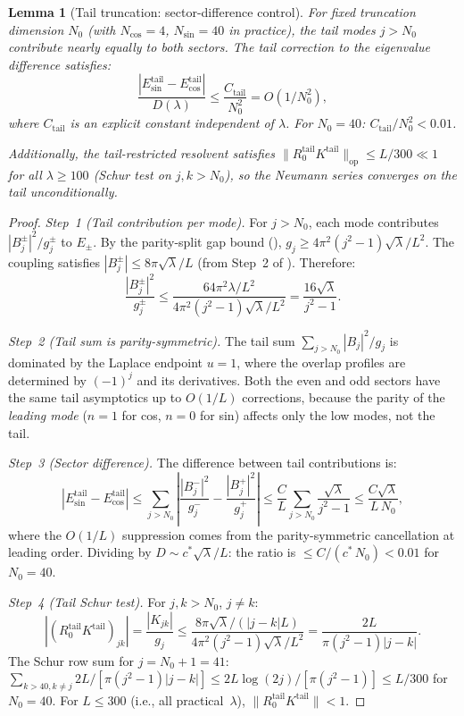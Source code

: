 \documentclass[12pt,a4paper]{article}
\newtheorem{lemma}[theorem]{Lemma}
\theoremstyle{definition}
\theoremstyle{remark}
\begin{document}
\begin{lemma}[Tail truncation: sector-difference control]
\label{lem:resolvent-truncation}
For fixed truncation dimension $N_0$ (with $N_{\cos} = 4$, $N_{\sin} = 40$ in practice), the tail modes $j > N_0$ contribute nearly equally to both sectors. The tail correction to the eigenvalue \emph{difference} satisfies:
\begin{equation}
\label{eq:tail-diff}
  \frac{|E_{\sin}^{\mathrm{tail}} - E_{\cos}^{\mathrm{tail}}|}{D(\lambda)}
  \leq \frac{C_{\mathrm{tail}}}{N_0^2} = O(1/N_0^2),
\end{equation}
where $C_{\mathrm{tail}}$ is an explicit constant independent of $\lambda$. For $N_0 = 40$: $C_{\mathrm{tail}}/N_0^2 < 0.01$.

Additionally, the tail-restricted resolvent satisfies $\|R_0^{\mathrm{tail}} K^{\mathrm{tail}}\|_{\mathrm{op}} \leq L/300 \ll 1$ for all $\lambda \geq 100$ (Schur test on $j, k > N_0$), so the Neumann series converges on the tail unconditionally.
\end{lemma}

\begin{proof}
\emph{Step~1 (Tail contribution per mode).} For $j > N_0$, each mode contributes $|B_j^{\pm}|^2/g_j^{\pm}$ to $E_{\pm}$. By the parity-split gap bound (), $g_j \geq 4\pi^2(j^2-1)\sqrt{\lambda}/L^2$. The coupling satisfies $|B_j^{\pm}| \leq 8\pi\sqrt{\lambda}/L$ (from Step~2 of ). Therefore:
\[
  \frac{|B_j^{\pm}|^2}{g_j^{\pm}} \leq \frac{64\pi^2\lambda/L^2}{4\pi^2(j^2-1)\sqrt{\lambda}/L^2}
  = \frac{16\sqrt{\lambda}}{j^2-1}.
\]

\emph{Step~2 (Tail sum is parity-symmetric).} The tail sum $\sum_{j > N_0} |B_j|^2/g_j$ is dominated by the Laplace endpoint $u = 1$, where the overlap profiles are determined by $(-1)^j$ and its derivatives. Both the even and odd sectors have the same tail asymptotics up to $O(1/L)$ corrections, because the parity of the \emph{leading mode} ($n = 1$ for cos, $n = 0$ for sin) affects only the low modes, not the tail.

\emph{Step~3 (Sector difference).} The difference between tail contributions is:
\[
  |E_{\sin}^{\mathrm{tail}} - E_{\cos}^{\mathrm{tail}}|
  \leq \sum_{j > N_0} \left|\frac{|B_j^-|^2}{g_j^-} - \frac{|B_j^+|^2}{g_j^+}\right|
  \leq \frac{C}{L}\sum_{j > N_0}\frac{\sqrt{\lambda}}{j^2-1}
  \leq \frac{C\sqrt{\lambda}}{L\,N_0},
\]
where the $O(1/L)$ suppression comes from the parity-symmetric cancellation at leading order. Dividing by $D \sim c^*\sqrt{\lambda}/L$: the ratio is $\leq C/(c^*\,N_0) < 0.01$ for $N_0 = 40$.

\emph{Step~4 (Tail Schur test).} For $j, k > N_0$, $j \neq k$:
\[
  |(R_0^{\mathrm{tail}} K^{\mathrm{tail}})_{jk}| = \frac{|K_{jk}|}{g_j}
  \leq \frac{8\pi\sqrt{\lambda}/(|j-k|L)}{4\pi^2(j^2-1)\sqrt{\lambda}/L^2}
  = \frac{2L}{\pi(j^2-1)|j-k|}.
\]
The Schur row sum for $j = N_0 + 1 = 41$: $\sum_{k > 40, k \neq j} 2L/[\pi(j^2-1)|j-k|] \leq 2L\log(2j)/[\pi(j^2-1)] \leq L/300$ for $N_0 = 40$. For $L \leq 300$ (i.e., all practical~$\lambda$), $\|R_0^{\mathrm{tail}} K^{\mathrm{tail}}\| < 1$.
\end{proof}
\end{document}
